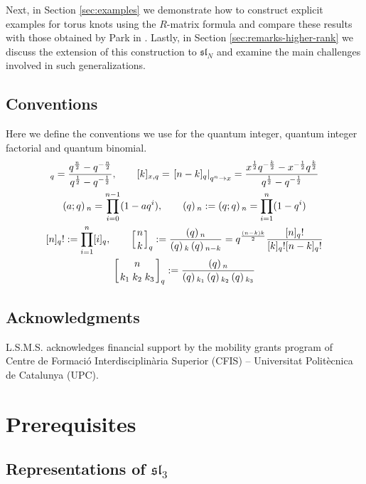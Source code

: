 \documentclass[12pt,oneside,reqno]{amsart}
\numberwithin{teorema}{section}
\numberwithin{definicion}{section}
\numberwithin{lema}{section}
\numberwithin{conjetura}{section}
\numberwithin{proposicion}{section}
\def\sl{\mathfrak{sl}}
\newcommand{\qbinom}[2]{\left[\genfrac{}{}{0pt}{}{#1}{#2}\right]_q}
\begin{document}
Next, in Section \ref{sec:examples} we demonstrate how to construct explicit examples for torus knots using the $R$-matrix formula and compare these results with those obtained by Park in \cite{Park20}.  Lastly, in Section \ref{sec:remarks-higher-rank} we discuss the extension of this construction to $\sl_N$ and examine the main challenges involved in such generalizations.


\subsection*{Conventions} 

Here we define the conventions we use for the quantum integer, quantum integer factorial and quantum binomial.
\begin{gather*}
    [n]_q=\frac{q^{\frac{n}{2}}-q^{-\frac{n}{2}}}{q^{\frac{1}{2}}-q^{-\frac{1}{2}}}, \hspace{2em} [k]_{x,q}=\left.[n-k]_q\right|_{q^n\rightarrow x}=\frac{x^\frac12q^{-\frac{k}{2}}-x^{-\frac12}q^\frac{k}{2}}{q^\frac12-q^{-\frac12}} \\
    \left(a;q\right){}_{n} = \prod_{i=0}^{n-1} (1-aq^i), \hspace{2em} \left(q\right){}_{n} := \left(q;q\right){}_{n} = \prod_{i=1}^n (1-q^i) \\
    [n]_q!:=\prod_{i=1}^n [i]_q, \hspace{2em} \qbinom{n}{k}:=\frac{\left(q\right){}_{n}}{\left(q\right){}_{k}\left(q\right){}_{n-k}} = q^{\frac{(n-k)k}{2}}\frac{[n]_q!}{[k]_q![n-k]_q!} \\
    \qbinom{n}{k_1\;k_2\;k_3}:=\frac{\left(q\right){}_{n}}{\left(q\right){}_{k_1}\left(q\right){}_{k_2}\left(q\right){}_{k_3}}
\end{gather*}

\subsection*{Acknowledgments}

L.S.M.S. acknowledges financial support by the mobility grants program of Centre de Formació Interdisciplinària Superior (CFIS) -- Universitat Politècnica de Catalunya (UPC).

\section{Prerequisites}\label{sec:prerequisites}

\subsection{Representations of \texorpdfstring{$\sl_3$}{sl3}}
\end{document}
